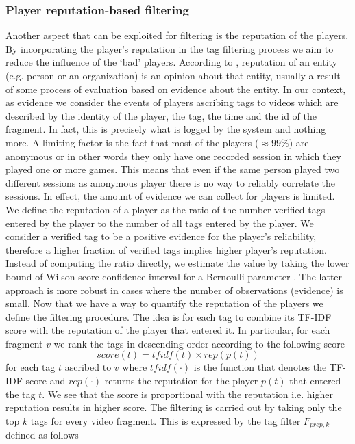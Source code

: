 \subsubsection{Player reputation-based filtering}
Another aspect that can be exploited for filtering is the reputation of the players. By incorporating the player's reputation in the tag filtering process we aim to reduce the influence of the `bad' players. According to \cite{Farmer10}, reputation of an entity (e.g. person or an organization) is an opinion about that entity, usually a result of some process of evaluation based on evidence about the entity. In our context, as evidence we consider the events of players ascribing tags to videos which are described by the identity of the player, the tag, the time and the id of the fragment. In fact, this is precisely what is logged by the system and nothing more. A limiting factor is the fact that most of the players ($\approx 99\%$) are anonymous or in other words they only have one recorded session in which they played one or more games. This means that even if the same person played two different sessions as anonymous player there is no way to reliably correlate the sessions. In effect, the amount of evidence we can collect for players is limited.
We define the reputation of a player as the ratio of the number verified tags entered by the player to the number of all tags entered by the player. We consider a verified tag to be a positive evidence for the player's reliability, therefore a higher fraction of verified tags implies higher player's reputation. Instead of computing the ratio directly, we estimate the value by taking the lower bound of Wilson score confidence interval for a Bernoulli parameter \cite{citeulike:1060968,Wilson1927}. The latter approach is more robust in cases where the number of observations (evidence) is small. Now that we have a way to quantify the reputation of the players we define the filtering procedure. The idea is for each tag to combine its TF-IDF score with the reputation of the player that entered it. In particular, for each fragment $v$ we rank the tags in descending order according to the following score
\begin{equation}\label{rep-score}
	score(t) = tfidf(t) \times rep(p(t))
\end{equation}
for each tag $t$ ascribed to $v$ where $tfidf(\cdot)$ is the function that denotes the TF-IDF score and $rep(\cdot)$ returns the reputation for the player $p(t)$ that entered the tag $t$. We see that the score is proportional with the reputation i.e. higher reputation results in higher score.  The filtering is carried out by taking only the top $k$ tags for every video fragment. This is expressed by the tag filter $F_{prep,k}$ defined as follows
